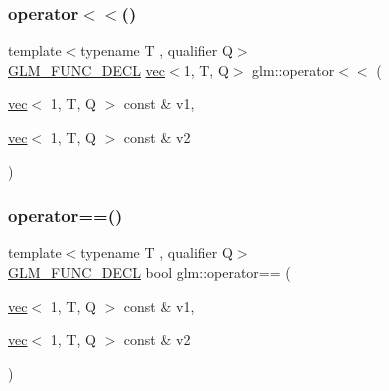 \subsubsection{\texorpdfstring{operator$<$$<$()}{operator<<()}\hspace{0.1cm}{\footnotesize\ttfamily [3/3]}}
{\footnotesize\ttfamily template$<$typename T , qualifier Q$>$ \\
\mbox{\hyperlink{setup_8hpp_ab2d052de21a70539923e9bcbf6e83a51}{G\+L\+M\+\_\+\+F\+U\+N\+C\+\_\+\+D\+E\+CL}} \mbox{\hyperlink{structglm_1_1vec}{vec}}$<$1, T, Q$>$ glm\+::operator$<$$<$ (\begin{DoxyParamCaption}\item[{\mbox{\hyperlink{structglm_1_1vec}{vec}}$<$ 1, T, Q $>$ const \&}]{v1,  }\item[{\mbox{\hyperlink{structglm_1_1vec}{vec}}$<$ 1, T, Q $>$ const \&}]{v2 }\end{DoxyParamCaption})}

\mbox{\label{group__ext__vec1_gaa9cd0f18629236bade24765fd5d2616b}} 
\subsubsection{\texorpdfstring{operator==()}{operator==()}}
{\footnotesize\ttfamily template$<$typename T , qualifier Q$>$ \\
\mbox{\hyperlink{setup_8hpp_ab2d052de21a70539923e9bcbf6e83a51}{G\+L\+M\+\_\+\+F\+U\+N\+C\+\_\+\+D\+E\+CL}} bool glm\+::operator== (\begin{DoxyParamCaption}\item[{\mbox{\hyperlink{structglm_1_1vec}{vec}}$<$ 1, T, Q $>$ const \&}]{v1,  }\item[{\mbox{\hyperlink{structglm_1_1vec}{vec}}$<$ 1, T, Q $>$ const \&}]{v2 }\end{DoxyParamCaption})}

\mbox{\label{group__ext__vec1_ga4fbe19c5f5fba90c89934a540de87bc5}} 
